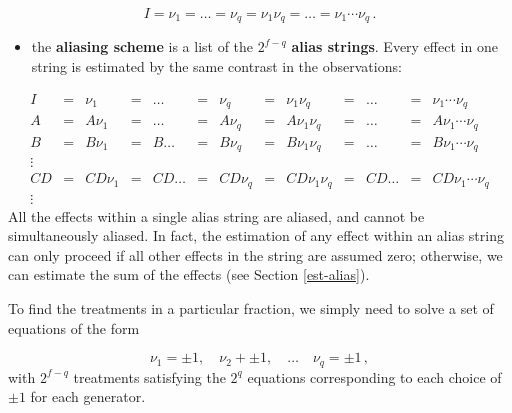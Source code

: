 \documentclass[
]{book}
\providecommand{\tightlist}{%
  \setlength{\itemsep}{0pt}\setlength{\parskip}{0pt}}
\theoremstyle{definition}
\theoremstyle{definition}
\theoremstyle{definition}
\theoremstyle{definition}
\theoremstyle{remark}
\begin{document}
\[
I = \nu_1 = \ldots = \nu_q = \nu_1\nu_q = \ldots = \nu_1\cdots\nu_q\,. 
\]

\begin{itemize}
\tightlist
\item
  the \textbf{aliasing scheme} is a list of the \(2^{f-q}\) \textbf{alias strings}. Every effect in one string is estimated by the same contrast in the observations:
\end{itemize}

\[
 \begin{array}{ccccccccccccc}
 I & = & \nu_1 & = & \ldots & = & \nu_q & = & \nu_1\nu_q 
 & = & \ldots & = & \nu_1\cdots\nu_q \\
 A & = & A\nu_1 & = & \ldots & = & A\nu_q & = & A\nu_1\nu_q 
 & = & \ldots & = & A\nu_1\cdots\nu_q \\
 B & = & B\nu_1 & = & B\ldots & = & B\nu_q & = & B\nu_1\nu_q 
 & = & \ldots & = & B\nu_1\cdots\nu_q \\
 \vdots \\
 CD & = & CD\nu_1 & = & CD\ldots & = & CD\nu_q & = & CD\nu_1\nu_q 
 & = & CD\ldots & = & CD\nu_1\cdots\nu_q \\
 \vdots
 \end{array}
 \]
All the effects within a single alias string are aliased, and cannot be simultaneously aliased. In fact, the estimation of any effect within an alias string can only proceed if all other effects in the string are assumed zero; otherwise, we can estimate the sum of the effects (see Section \ref{est-alias}).

To find the treatments in a particular fraction, we simply need to solve a set of equations of the form

\[
\nu_1 = \pm 1, \quad \nu_2 + \pm 1, \quad \ldots \quad \nu_q = \pm 1\,,
\]
with \(2^{f-q}\) treatments satisfying the \(2^q\) equations corresponding to each choice of \(\pm 1\) for each generator.
\end{document}
